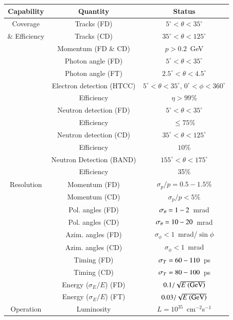 \documentclass[final,3p,twocolumn]{elsarticle}
\begin{document}
\begin{table}[t!]
\begin{center}
\begin{tabular}{c|c|c} \hline
Capability &  Quantity & Status \\ \hline
Coverage&Tracks (FD) & $5^\circ < \theta < 35^\circ $ \\
\& Efficiency &Tracks (CD)& $35^\circ < \theta < 125^\circ$  \\ \cline{2-3}
&Momentum (FD \& CD) & $p > 0.2$~GeV  \\ \cline{2-3}
&Photon angle (FD)& $5^\circ < \theta < 35^\circ$ \\ 
&Photon angle (FT)& $2.5^\circ < \theta < 4.5^\circ$ \\  \cline{2-3} 
&Electron detection (HTCC)& $5^\circ < \theta < 35^\circ$, $0^\circ < \phi < 360^\circ$ \\
&Efficiency & $\eta > 99\%$ \\ \cline{2-3}
&Neutron detection (FD) & $5^\circ < \theta < 35^\circ $ \\
&Efficiency& $\le  75\%$ \\  \cline{2-3}
&Neutron detection (CD) &  $ 35^\circ < \theta < 125^\circ$ \\
&Efficiency& $10\%$ \\ \cline{2-3}
&Neutron Detection (BAND) & $155^\circ < \theta < 175^\circ$\\
&Efficiency & 35\% \\\hline
Resolution & Momentum (FD)& $\sigma_p/p = 0.5-1.5\%$ \\
& Momentum (CD) & $\sigma_p/p  < 5 \%$\\ \cline{2-3}
 & Pol. angles (FD) & $ \sigma_\theta = \rm  1- 2$~mrad  \\
 & Pol. angles (CD) & $\sigma_\theta =  \rm 10- 20$~mrad \\ \cline{2-3}
& Azim. angles (FD) & $\sigma_\phi  < 1$~mrad/$\sin\phi$ \\
& Azim. angles (CD) & $\sigma_\phi < 1$~mrad \\ \cline{2-3}
 & Timing (FD) & $\sigma_T =\rm  60 - 110$~ps  \\
& Timing (CD) & $\sigma_T = \rm 80 - 100 $~ps \\ \cline{2-3}
& Energy ($\sigma_E / E$)  (FD) & $0.1/\sqrt{E~{\rm(GeV)}}$ \\
& Energy ($\sigma_E / E$)  (FT) & $0.03/\sqrt{E~{\rm(GeV)}}$\\ \hline
Operation & Luminosity &  $L = 10^{35}$~cm$^{-2}$s$^{-1}$ \\ \hline

\end{tabular}
\end{center}
\end{table}
\end{document}
